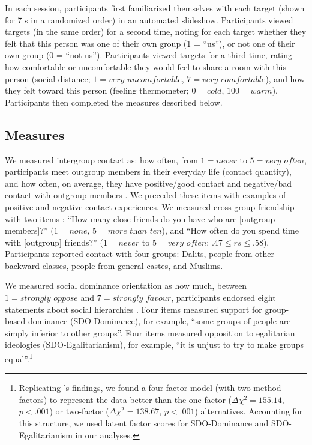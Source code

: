 \documentclass[12pt, a4paper]{article}
\begin{document}
In each session, participants first familiarized themselves with each target (shown for 7 s in a randomized order) in an automated slideshow. Participants viewed targets (in the same order) for a second time, noting for each target whether they felt that this person was one of their own group (1 = ``us''), or not one of their own group (0 = ``not us''). Participants viewed targets for a third time, rating how comfortable or uncomfortable they would feel to share a room with this person (social distance; $1 = \textit{very uncomfortable}$, $7 = \textit{very comfortable}$), and how they felt toward this person (feeling thermometer; $0 = \textit{cold}$, $100 = \textit{warm}$). Participants then completed the measures described below.

\subsection{Measures}

We measured intergroup contact as: how often, from $1 = \textit{never}$ to $5 = \textit{very often}$, participants meet outgroup members in their everyday life (contact quantity), and how often, on average, they have positive/good contact and negative/bad contact with outgroup members \cite{barlow_contact_2012}. We preceded these items with examples of positive and negative contact experiences. We measured cross-group friendship with two items \cite{turner_reducing_2007}: ``How many close friends do you have who are [outgroup members]?'' ($1 = \textit{none}$, $5 = \textit{more than ten}$), and ``How often do you spend time with [outgroup] friends?'' ($1 = \textit{never}$ to $5 = \textit{very often}$; $.47\leq\textit{rs}\leq.58$). Participants reported contact with four groups: Dalits, people from other backward classes, people from general castes, and Muslims.

We measured social dominance orientation as how much, between $1 = \textit{strongly oppose}$ and $7 = \textit{strongly favour}$, participants endorsed eight statements about social hierarchies \cite{ho_nature_2015}. Four items measured support for group-based dominance (SDO-Dominance), for example, ``some groups of people are simply inferior to other groups''. Four items measured opposition to egalitarian ideologies (SDO-Egalitarianism), for example, ``it is unjust to try to make groups equal''.\footnote{Replicating \citeauthor{ho_nature_2015}’s \citeyear{ho_nature_2015} findings, we found a four-factor model (with two method factors) to represent the data better than the one-factor ($\Delta\chi^2 = 155.14$, $p < .001$) or two-factor ($\Delta\chi^2 = 138.67$, $p < .001$) alternatives. Accounting for this structure, we used latent factor scores for SDO-Dominance and SDO-Egalitarianism in our analyses.}
\end{document}
